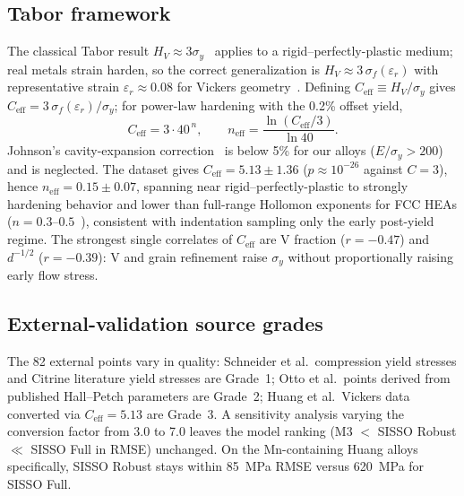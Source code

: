 \documentclass[11pt]{article}
\begin{document}
\subsection{Tabor framework}
The classical Tabor result $H_V \approx 3\sigma_y$~\cite{Tabor1951} applies to a rigid--perfectly-plastic medium; real metals strain harden, so the correct generalization is $H_V \approx 3\,\sigma_f(\varepsilon_r)$ with representative strain $\varepsilon_r \approx 0.08$ for Vickers geometry~\cite{Dao2001}. Defining $C_\text{eff} \equiv H_V/\sigma_y$ gives $C_\text{eff} = 3\,\sigma_f(\varepsilon_r)/\sigma_y$; for power-law hardening with the 0.2\% offset yield,
\begin{equation}
C_\text{eff} = 3 \cdot 40^{\,n}, \qquad n_\text{eff} = \frac{\ln(C_\text{eff}/3)}{\ln 40}.
\label{eq:neff}
\end{equation}
Johnson's cavity-expansion correction~\cite{Johnson1970} is below 5\% for our alloys ($E/\sigma_y > 200$) and is neglected. The dataset gives $C_\text{eff} = 5.13 \pm 1.36$ ($p \approx 10^{-26}$ against $C = 3$), hence $n_\text{eff} = 0.15 \pm 0.07$, spanning near rigid--perfectly-plastic to strongly hardening behavior and lower than full-range Hollomon exponents for FCC HEAs ($n = 0.3$--$0.5$~\cite{Otto2013,Wu2014}), consistent with indentation sampling only the early post-yield regime. The strongest single correlates of $C_\text{eff}$ are V fraction ($r = -0.47$) and $d^{-1/2}$ ($r = -0.39$): V and grain refinement raise $\sigma_y$ without proportionally raising early flow stress.

\subsection{External-validation source grades}
The 82 external points vary in quality: Schneider et al.\ compression yield stresses and Citrine literature yield stresses are Grade~1; Otto et al.\ points derived from published Hall--Petch parameters are Grade~2; Huang et al.\ Vickers data converted via $C_\text{eff} = 5.13$ are Grade~3. A sensitivity analysis varying the conversion factor from 3.0 to 7.0 leaves the model ranking (M3 $<$ SISSO Robust $\ll$ SISSO Full in RMSE) unchanged. On the Mn-containing Huang alloys specifically, SISSO Robust stays within 85~\si{MPa} RMSE versus 620~\si{MPa} for SISSO Full.
\end{document}

